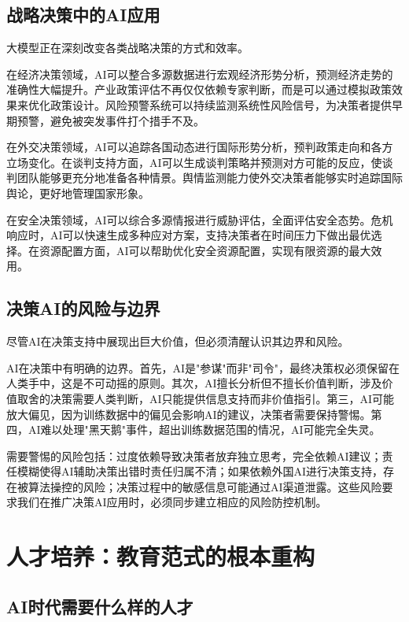 \subsection{战略决策中的AI应用}

大模型正在深刻改变各类战略决策的方式和效率。

在经济决策领域，AI可以整合多源数据进行宏观经济形势分析，预测经济走势的准确性大幅提升。产业政策评估不再仅仅依赖专家判断，而是可以通过模拟政策效果来优化政策设计。风险预警系统可以持续监测系统性风险信号，为决策者提供早期预警，避免被突发事件打个措手不及。

在外交决策领域，AI可以追踪各国动态进行国际形势分析，预判政策走向和各方立场变化。在谈判支持方面，AI可以生成谈判策略并预测对方可能的反应，使谈判团队能够更充分地准备各种情景。舆情监测能力使外交决策者能够实时追踪国际舆论，更好地管理国家形象。

在安全决策领域，AI可以综合多源情报进行威胁评估，全面评估安全态势。危机响应时，AI可以快速生成多种应对方案，支持决策者在时间压力下做出最优选择。在资源配置方面，AI可以帮助优化安全资源配置，实现有限资源的最大效用。

\subsection{决策AI的风险与边界}

尽管AI在决策支持中展现出巨大价值，但必须清醒认识其边界和风险。

AI在决策中有明确的边界。首先，AI是"参谋"而非"司令"，最终决策权必须保留在人类手中，这是不可动摇的原则。其次，AI擅长分析但不擅长价值判断，涉及价值取舍的决策需要人类判断，AI只能提供信息支持而非价值指引。第三，AI可能放大偏见，因为训练数据中的偏见会影响AI的建议，决策者需要保持警惕。第四，AI难以处理"黑天鹅"事件，超出训练数据范围的情况，AI可能完全失灵。

需要警惕的风险包括：过度依赖导致决策者放弃独立思考，完全依赖AI建议；责任模糊使得AI辅助决策出错时责任归属不清；如果依赖外国AI进行决策支持，存在被算法操控的风险；决策过程中的敏感信息可能通过AI渠道泄露。这些风险要求我们在推广决策AI应用时，必须同步建立相应的风险防控机制。

\section{人才培养：教育范式的根本重构}

\subsection{AI时代需要什么样的人才}

